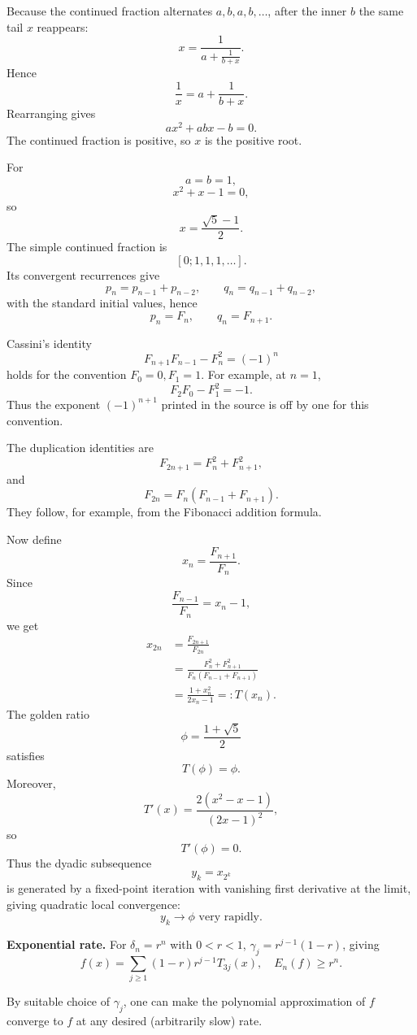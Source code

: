 \begin{solution}
Because the continued fraction alternates \(a,b,a,b,\ldots\), after the inner \(b\) the same
tail \(x\) reappears:
\[
x
=
\frac{1}{
a+\frac1{b+x}
}.
\]
Hence
\[
\frac1x
=
a+\frac1{b+x}.
\]
Rearranging gives
\[
\boxed{
ax^2+abx-b=0.
}
\]
The continued fraction is positive, so \(x\) is the positive root.

For
\[
a=b=1,
\]
\[
x^2+x-1=0,
\]
so
\[
\boxed{
x=\frac{\sqrt5-1}{2}.
}
\]
The simple continued fraction is
\[
[0;1,1,1,\ldots].
\]
Its convergent recurrences give
\[
p_n=p_{n-1}+p_{n-2},
\qquad
q_n=q_{n-1}+q_{n-2},
\]
with the standard initial values, hence
\[
\boxed{
p_n=F_n,
\qquad
q_n=F_{n+1}.
}
\]

Cassini's identity
\[
\boxed{
F_{n+1}F_{n-1}-F_n^2=(-1)^n
}
\]
holds for the convention \(F_0=0,F_1=1\). For example, at \(n=1\),
\[
F_2F_0-F_1^2=-1.
\]
Thus the exponent \((-1)^{n+1}\) printed in the source is off by one for this convention.

The duplication identities are
\[
\boxed{
F_{2n+1}=F_n^2+F_{n+1}^2,
}
\]
and
\[
\boxed{
F_{2n}
=
F_n(F_{n-1}+F_{n+1}).
}
\]
They follow, for example, from the Fibonacci addition formula.

Now define
\[
x_n=\frac{F_{n+1}}{F_n}.
\]
Since
\[
\frac{F_{n-1}}{F_n}
=
x_n-1,
\]
we get
\[
\begin{aligned}
x_{2n}
&=
\frac{F_{2n+1}}{F_{2n}}\\
&=
\frac{F_n^2+F_{n+1}^2}
{F_n(F_{n-1}+F_{n+1})}\\
&=
\frac{1+x_n^2}{2x_n-1}
=:T(x_n).
\end{aligned}
\]
The golden ratio
\[
\phi=\frac{1+\sqrt5}{2}
\]
satisfies
\[
T(\phi)=\phi.
\]
Moreover,
\[
T'(x)
=
\frac{2(x^2-x-1)}{(2x-1)^2},
\]
so
\[
T'(\phi)=0.
\]
Thus the dyadic subsequence
\[
y_k=x_{2^k}
\]
is generated by a fixed-point iteration with vanishing first derivative at the limit, giving
quadratic local convergence:
\[
\boxed{
y_k\to\phi
\text{ very rapidly}.
}
\]
\end{solution}


\begin{problem}[CP-II-0038]
\label{prob:cp-ii-0038}
\textbf{Exponential rate.}
	For $\delta_n=r^n$ with $0<r<1$, $\gamma_j=r^{j-1}(1-r)$, giving
	\[
	f(x)=\sum_{j\ge1}(1-r)r^{j-1}T_{3j}(x),
	\quad E_n(f)\ge r^n.
	\]

By suitable choice of $\gamma_j$, one can make the polynomial approximation
of $f$ converge to $f$ at any desired (arbitrarily slow) rate.
\end{problem}

